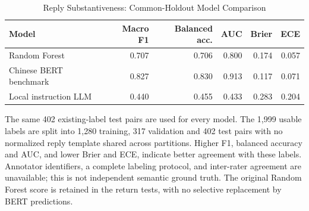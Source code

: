 \begin{table}[H]
\centering\footnotesize
\caption{Reply Substantiveness: Common-Holdout Model Comparison}\label{tab:substantiveness_benchmark}
\begin{threeparttable}
\renewcommand{\arraystretch}{1.12}
\begin{tabular*}{\textwidth}{@{\extracolsep{\fill}}lrrrrr@{}}
\toprule
Model & Macro F1 & Balanced acc. & AUC & Brier & ECE \\
\midrule
Random Forest & 0.707 & 0.706 & 0.800 & 0.174 & 0.057 \\
Chinese BERT benchmark & 0.827 & 0.830 & 0.913 & 0.117 & 0.071 \\
Local instruction LLM & 0.440 & 0.455 & 0.433 & 0.283 & 0.204 \\
\bottomrule
\end{tabular*}
\begin{tablenoteblock}
The same 402 existing-label test pairs are used for every model. The 1,999 usable labels are split into 1,280 training, 317 validation and 402 test pairs with no normalized reply template shared across partitions. Higher F1, balanced accuracy and AUC, and lower Brier and ECE, indicate better agreement with these labels. Annotator identifiers, a complete labeling protocol, and inter-rater agreement are unavailable; this is not independent semantic ground truth. The original Random Forest score is retained in the return tests, with no selective replacement by BERT predictions.
\end{tablenoteblock}
\end{threeparttable}
\end{table}
